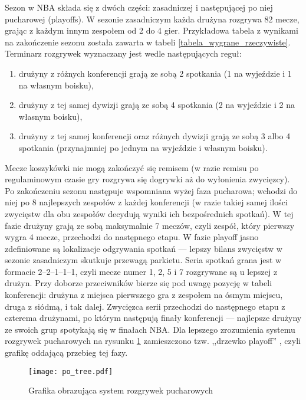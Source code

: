 \documentclass[inzynierska]{pwr_wmat_praca_dyplomowa}
\theoremstyle{plain}
\numberwithin{theorem}{chapter}
\theoremstyle{definition}
\numberwithin{theorem}{chapter}
\begin{document}
Sezon w NBA składa się z dwóch części: zasadniczej i następującej po niej pucharowej (playoffs). W sezonie zasadniczym każda drużyna rozgrywa 82 mecze, grając z każdym innym zespołem od 2 do 4 gier. Przykładowa tabela z wynikami na zakończenie sezonu została zawarta w tabeli \ref{tabela_wygrane_rzeczywiste}. Terminarz rozgrywek wyznaczany jest wedle następujących reguł:
\begin{enumerate}
	\item drużyny z różnych konferencji grają ze sobą 2 spotkania (1 na wyjeździe i 1 na własnym boisku),
	\item drużyny z tej samej dywizji grają ze sobą 4 spotkania (2 na wyjeździe i 2 na własnym boisku),
	\item drużyny z tej samej konferencji oraz różnych dywizji grają ze sobą 3 albo 4 spotkania (przynajmniej po jednym na wyjeździe i własnym boisku).
\end{enumerate}
Mecze koszykówki nie mogą zakończyć się remisem (w razie remisu po regulaminowym czasie gry rozgrywa się dogrywki aż do wyłonienia zwycięzcy).
Po zakończeniu sezonu następuje wspomniana wyżej faza pucharowa; wchodzi do niej po 8 najlepszych zespołów z każdej konferencji (w razie takiej samej ilości zwycięstw dla obu zespołów decydują wyniki ich bezpośrednich spotkań). W tej fazie drużyny grają ze sobą maksymalnie 7 meczów, czyli zespół, który pierwszy wygra 4 mecze, przechodzi do następnego etapu. W fazie playoff jasno zdefiniowane są lokalizacje odgrywania spotkań --- lepszy bilans zwycięstw w sezonie zasadniczym skutkuje przewagą parkietu. Seria spotkań grana jest w formacie 2–2–1–1–1, czyli mecze numer 1, 2, 5 i 7 rozgrywane są u lepszej z drużyn. Przy doborze przeciwników bierze się pod uwagę pozycję w tabeli konferencji: drużyna z miejsca pierwszego gra z zespołem na ósmym miejscu, druga z siódmą, i tak dalej. Zwycięzca serii przechodzi do następnego etapu z czterema drużynami, po którym następują finały konferencji --- najlepsze drużyny ze swoich grup spotykają się w finałach NBA. Dla lepszego zrozumienia systemu rozgrywek pucharowych na rysunku \ref{po_tree} zamieszczono tzw. ,,drzewko playoff'' \cite{playoffs}, czyli grafikę oddającą przebieg tej fazy.
\begin{figure}[t]
	\texttt{[image: po\_tree.pdf]}
	\caption{Grafika obrazująca system rozgrywek pucharowych \cite{playoffs}}\label{po_tree}
	\centering
\end{figure}
\end{document}
